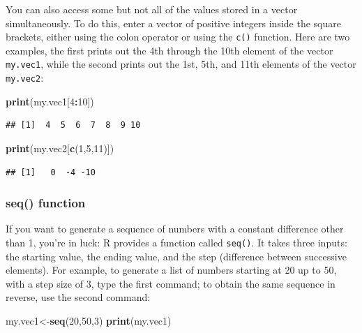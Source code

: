 \documentclass[
]{book}
\newenvironment{Shaded}{\begin{snugshade}}{\end{snugshade}}
\newcommand{\DecValTok}[1]{\textcolor[rgb]{0.00,0.00,0.81}{#1}}
\newcommand{\KeywordTok}[1]{\textcolor[rgb]{0.13,0.29,0.53}{\textbf{#1}}}
\newcommand{\NormalTok}[1]{#1}
\newcommand{\OperatorTok}[1]{\textcolor[rgb]{0.81,0.36,0.00}{\textbf{#1}}}
\theoremstyle{definition}
\theoremstyle{definition}
\theoremstyle{definition}
\theoremstyle{remark}
\begin{document}
You can also access some but not all of the values stored in a vector simultaneously. To do this, enter a vector of positive integers inside the square brackets, either using the colon operator or using the \texttt{c()} function. Here are two examples, the first prints out the 4th through the 10th element of the vector \texttt{my.vec1}, while the second prints out the 1st, 5th, and 11th elements of the vector \texttt{my.vec2}:

\begin{Shaded}
\begin{Highlighting}[]
\KeywordTok{print}\NormalTok{(my.vec1[}\DecValTok{4}\OperatorTok{:}\DecValTok{10}\NormalTok{])}
\end{Highlighting}
\end{Shaded}

\begin{verbatim}
## [1]  4  5  6  7  8  9 10
\end{verbatim}

\begin{Shaded}
\begin{Highlighting}[]
\KeywordTok{print}\NormalTok{(my.vec2[}\KeywordTok{c}\NormalTok{(}\DecValTok{1}\NormalTok{,}\DecValTok{5}\NormalTok{,}\DecValTok{11}\NormalTok{)])}
\end{Highlighting}
\end{Shaded}

\begin{verbatim}
## [1]   0  -4 -10
\end{verbatim}

\hypertarget{seq-function}{%
\subsubsection{seq() function}\label{seq-function}}

If you want to generate a sequence of numbers with a constant difference other than 1, you're in luck: R provides a function called \texttt{seq()}. It takes three inputs: the starting value, the ending value, and the step (difference between successive elements). For example, to generate a list of numbers starting at 20 up to 50, with a step size of 3, type the first command; to obtain the same sequence in reverse, use the second command:

\begin{Shaded}
\begin{Highlighting}[]
\NormalTok{my.vec1\textless{}{-}}\KeywordTok{seq}\NormalTok{(}\DecValTok{20}\NormalTok{,}\DecValTok{50}\NormalTok{,}\DecValTok{3}\NormalTok{)}
\KeywordTok{print}\NormalTok{(my.vec1)}
\end{Highlighting}
\end{Shaded}
\end{document}
